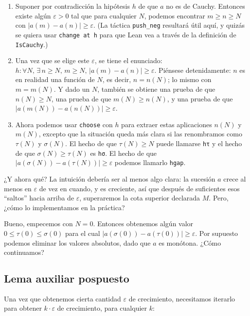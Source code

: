 \begin{enumerate}
  \item Suponer por contradicción la hipótesis $h$ de que $a$ no es de
    Cauchy. Entonces existe algún $\varepsilon > 0$ tal que para cualquier
    $N$, podemos encontrar $m \geq n \geq N$ con
    $|a(m) - a(n)| \geq \varepsilon$. (La táctica \texttt{push\_neg}
    resultará útil aquí, y quizás se quiera usar \texttt{change at h}
    para que Lean vea a través de la definición de \texttt{IsCauchy}.)

  \item Una vez que se elige este $\varepsilon$, se tiene el enunciado:
    $h : \forall N,\, \exists\, n \geq N,\, m \geq N,\, |a(m) - a(n)| \geq \varepsilon$.
    Piénsese detenidamente: $n$ es en realidad una función de $N$, es
    decir, $n = n(N)$; lo mismo con $m = m(N)$. Y dado un $N$, también se
    obtiene una prueba de que $n(N) \geq N$, una prueba de que
    $m(N) \geq n(N)$, y una prueba de que
    $|a(m(N)) - a(n(N))| \geq \varepsilon$.

  \item Ahora podemos usar \texttt{choose} con $h$ para extraer estas
    aplicaciones $n(N)$ y $m(N)$, excepto que la situación queda más
    clara si las renombramos como $\tau(N)$ y $\sigma(N)$. El hecho de
    que $\tau(N) \geq N$ puede llamarse \texttt{hτ} y el hecho de que
    $\sigma(N) \geq \tau(N)$ es \texttt{hσ}. El hecho de que
    $|a(\sigma(N)) - a(\tau(N))| \geq \varepsilon$ podemos llamarlo
    \texttt{hgap}.
\end{enumerate}

¿Y ahora qué? La intuición debería ser al menos algo clara: la sucesión
$a$ crece al menos en $\varepsilon$ de vez en cuando, y es creciente, así
que después de suficientes esos ``saltos'' hacia arriba de $\varepsilon$,
superaremos la cota superior declarada $M$. Pero, ¿cómo lo implementamos
en la práctica?

Bueno, empecemos con $N = 0$. Entonces obtenemos algún valor
$0 \leq \tau(0) \leq \sigma(0)$ para el cual
$|a(\sigma(0)) - a(\tau(0))| \geq \varepsilon$. Por supuesto podemos
eliminar los valores absolutos, dado que $a$ es monótona. ¿Cómo
continuamos?

\subsection{Lema auxiliar pospuesto}

Una vez que obtenemos cierta cantidad $\varepsilon$ de crecimiento,
necesitamos iterarlo para obtener $k \cdot \varepsilon$ de crecimiento,
para cualquier $k$:

